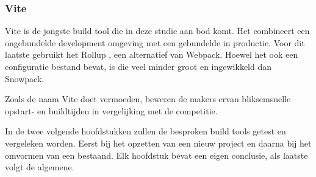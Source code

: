 \subsubsection{Vite}
Vite is de jongste build tool die in deze studie aan bod komt. Het combineert een ongebundelde development omgeving met een gebundelde in productie. Voor dit laatste gebruikt het Rollup \autocite{vite-no-date}, een alternatief van Webpack. Hoewel het ook een configuratie bestand bevat, is die veel minder groot en ingewikkeld dan Snowpack.

Zoals de naam Vite doet vermoeden, beweren de makers ervan bliksemsnelle opstart- en buildtijden in vergelijking met de competitie.


In de twee volgende hoofdstukken zullen de besproken build tools getest en vergeleken worden. Eerst bij het opzetten van een nieuw project en daarna bij het omvormen van een bestaand. Elk hoofdstuk bevat een eigen conclusie, als laatste volgt de algemene.

